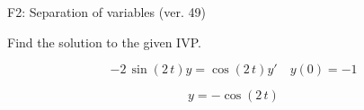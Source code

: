 \begin{exercise}
  \begin{exerciseTitle}F2: Separation of variables (ver. 49)\end{exerciseTitle}
  \begin{exerciseStatement}
    
Find the solution to the given IVP.

    
\[-2 \, \sin\left(2 \, t\right) y= \cos\left(2 \, t\right) y'\hspace{1em} y\left( 0 \right)= -1\]

  \end{exerciseStatement}
  \begin{exerciseAnswer}
    
\[y= -\cos\left(2 \, t\right)\]

  \end{exerciseAnswer}
\end{exercise}